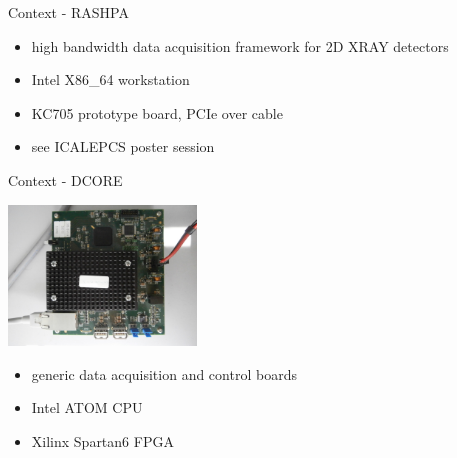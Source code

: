 \documentclass{beamer}
\begin{document}
\begin{frame}{Context - RASHPA}
  \begin{center}
    {
    \setlength{\fboxsep}{0pt}%
    \setlength{\fboxrule}{0pt}%
    }
  \end{center}
  \begin{tiny}
  \begin{itemize}
  \item high bandwidth data acquisition framework for 2D XRAY detectors
  \item Intel X86\_64 workstation
  \item KC705 prototype board, PCIe over cable
  \item see ICALEPCS poster session
  \end{itemize}
  \end{tiny}
\end{frame}

\begin{frame}{Context - DCORE}
  \begin{center}
    \includegraphics[width=50mm]{pic/dv_dcore/main.jpg}
  \end{center}
  \begin{small}
  \begin{itemize}
  \item generic data acquisition and control boards
  \item Intel ATOM CPU
  \item Xilinx Spartan6 FPGA
  \end{itemize}
  \end{small}
\end{frame}
\end{document}
